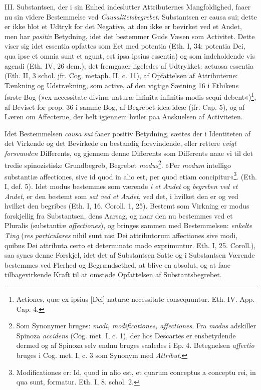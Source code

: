 \documentclass[12pt,a4paper]{book}
\newcommand{\opage}[1]{\marginnote{\footnotesize\textit{[#1]}}}
\begin{document}
III. Substantsen, der i sin Enhed indeslutter Attributernes
Mangfoldighed, faaer nu sin videre Bestemmelse ved
\emph{Causalitetsbegrebet}. Substantsen er causa sui; dette er
ikke blot et Udtryk for det Negative, at den ikke er bevirket ved et
Andet, men har \emph{positiv} Betydning, idet det bestemmer Guds Væsen
som Activitet. Dette viser sig idet essentia opfattes som Eet med
potentia (Eth. I, 34: potentia Dei, qua ipse et omnia sunt et agunt,
est ipsa ipsius essentia) og som indeholdende vis agendi (Eth. IV, 26
dem.); det fremgaaer ligeledes af Udtrykket: actuosa essentia (Eth. II,
3 schol. jfr. Cog. metaph. II, c. 11), af Opfattelsen af Attributerne:
Tænkning og Udstrækning, som active, af den vigtige Sætning 16 i
Ethikens første Bog
\opage{54} \setcounter{footnote}{0}%
(»ex necessitate divinæ naturæ infinita infinitis modis sequi
debent«)\footnote{Actiones, quæ ex ipsius [Dei] naturæ necessitate
consequuntur. Eth. IV. App. Cap. 4.}, af Beviset for prop. 36 i samme
Bog, af Begrebet idea ideæ (jfr. Cap. 5), og af Læren om Affecterne,
der helt igjennem hviler paa Anskuelsen af Activiteten.

Idet Bestemmelsen \emph{causa sui} faaer positiv Betydning, sættes der
i Identiteten af det Virkende og det Bevirkede en bestandig
forsvindende, eller rettere \emph{evigt forsvunden} Differents, og
gjennem denne Differents som Differents naae vi til det tredie
spinozistiske Grundbegreb, Begrebet \emph{modus}\footnote{Som
Synonymer bruges: \emph{modi, modificationes, affectiones}. Fra \emph{modus}
adskiller Spinoza \emph{accidens} (Cog. met. I, c. 1), der hos Descartes er
ensbetydende dermed og af Spinoza selv endnu bruges saaledes i Ep. 4.
Betegnelsen \emph{affectio} bruges i Cog. met. I, c. 3 som Synonym med
\emph{Attribut}.}. »Per \emph{modum} intelligo substantiæ affectiones, sive id
quod in alio est, per quod etiam concipitur«\footnote{Modificationes
er: Id, quod in alio est, et quarum conceptus a conceptu rei, in qua
sunt, formatur. Eth. I, 8. schol. 2.}. (Eth. I, def. 5). Idet modus
bestemmes som værende \emph{i et Andet} og \emph{begreben ved et Andet}, er
den bestemt som \emph{sat ved et Andet}, ved det, i hvilket den er og ved
hvilket den begribes (Eth. I, 16. Coroll. 1, 25). Bestemt som Virkning
er modus forskjellig fra Substantsen, dens Aarsag, og naar den nu
bestemmes ved et Pluralis (substantiæ \emph{affectiones}), og bringes
sammen med Bestemmelsen: \emph{enkelte Ting} (\emph{res particulares}
nihil sunt nisi Dei attributorum affectiones sive modi, quibus Dei
attributa certo et determinato modo exprimuntur. Eth. I, 25. Coroll.),
saa synes denne Forskjel, idet det af Substantsen Satte og i
Substantsen Værende bestemmes ved Flerhed og Begrændsethed, at blive en
absolut, og at faae tilbagevirkende Kraft til at omstøde Opfattelsen af
Substantsbegrebet.
\end{document}
